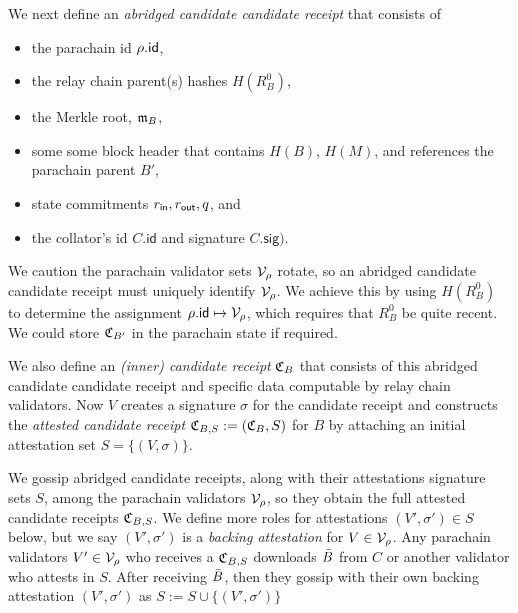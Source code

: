 We next define an {\em abridged candidate candidate receipt} that consists of 
\begin{itemize}
\item the parachain id $\rho.\mathsf{id}$,
\item the relay chain parent(s) hashes $H(R^0_B)$, 
\item the Merkle root, $\mathfrak{m}_B$,
\item some some block header that contains $H(B)$, $H(M)$, and references the parachain parent $B'$,
\item state commitments $r_{\mathsf{in}},r_{\mathsf{out}},q$, and
\item the collator's id $C.\mathsf{id}$ and signature $C.\mathsf{sig})$. 
\end{itemize}
We caution the parachain validator sets $\mathcal{V}_{\rho}$ rotate, so an abridged candidate candidate receipt must uniquely identify $\mathcal{V}_{\rho}$.  We achieve this by using $H(R^0_B)$ to determine the assignment $\rho.\mathsf{id} \mapsto \mathcal{V}_{\rho}$, which requires that $R^0_B$ be quite recent.  We could store $\mathfrak{C}_{B'}$ in the parachain state if required. 

We also define an {\em (inner) candidate receipt} $\mathfrak{C}_B$ that consists of this abridged candidate candidate receipt and specific data computable by relay chain validators.  Now $V$ creates a signature $\sigma$ for the candidate receipt and constructs the {\em attested candidate receipt} $\mathfrak{C}_{B,S} := (\mathfrak{C}_B,S)$ for $B$ by attaching an initial attestation set $S = \{ (V,\sigma) \}$.

We gossip abridged candidate receipts, along with their attestations signature sets $S$, among the parachain validators $\mathcal{V}_{\rho}$, so they obtain the full attested candidate receipts $\mathfrak{C}_{B,S}$.  We define more roles for attestations $(V',\sigma') \in S$ below, but we say $(V',\sigma')$ is a {\em backing attestation} for $V \in \mathcal{V}_{\rho}$.
%
Any parachain validators $V' \in \mathcal{V}_{\rho}$ who receives a $\mathfrak{C}_{B,S}$ downloads $\bar{B}$ from $C$ or another validator who attests in $S$.  After receiving $\bar{B}$, then they gossip with their own backing attestation $(V',\sigma')$ as $S := S \cup \{ (V',\sigma') \}$

